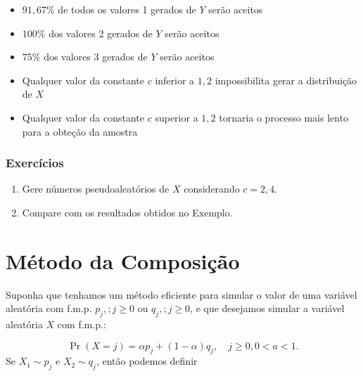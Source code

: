 \documentclass[
  letterpaper,
  DIV=11,
  numbers=noendperiod]{scrreprt}
\begin{document}
\begin{tcolorbox}[enhanced jigsaw, coltitle=black, bottomtitle=1mm, toprule=.15mm, arc=.35mm, colframe=quarto-callout-important-color-frame, breakable, opacityback=0, bottomrule=.15mm, rightrule=.15mm, titlerule=0mm, toptitle=1mm, title={Observações}, leftrule=.75mm, opacitybacktitle=0.6, left=2mm, colback=white, colbacktitle=quarto-callout-important-color!10!white]

\begin{itemize}
\item
  \(91,\!67\%\) de todos os valores 1 gerados de \(Y\) serão aceitos
\item
  \(100\%\) dos valores 2 gerados de \(Y\) serão aceitos
\item
  \(75\%\) dos valores 3 gerados de \(Y\) serão aceitos
\item
  Qualquer valor da constante \(c\) inferior a \(1,\!2\) impossibilita
  gerar a distribuição de \(X\)
\item
  Qualquer valor da constante \(c\) superior a \(1,\!2\) tornaria o
  processo mais lento para a obteção da amostra
\end{itemize}

\end{tcolorbox}

\subsubsection*{Exercícios}\label{exercuxedcios-2}

\begin{enumerate}
\def\labelenumi{\arabic{enumi}.}
\item
  Gere números pseudoaleatórios de \(X\) considerando \(c = 2,4\).
\item
  Compare com os resultados obtidos no Exemplo.
\end{enumerate}

\section{Método da Composição}\label{muxe9todo-da-composiuxe7uxe3o}

Suponha que tenhamos um método eficiente para simular o valor de uma
variável aleatória com f.m.p. \({p_j, ; j \geq 0}\) ou
\({q_j, ; j \geq 0}\), e que desejamos simular a variável aleatória
\(X\) com f.m.p.:

\[\Pr(X = j) = \alpha p_j + (1 - \alpha)q_j, \quad j \geq 0, 0 < a < 1.\]
Se \(X_1 \sim {p_j}\) e \(X_2 \sim {q_j}\), então podemos definir
\end{document}
